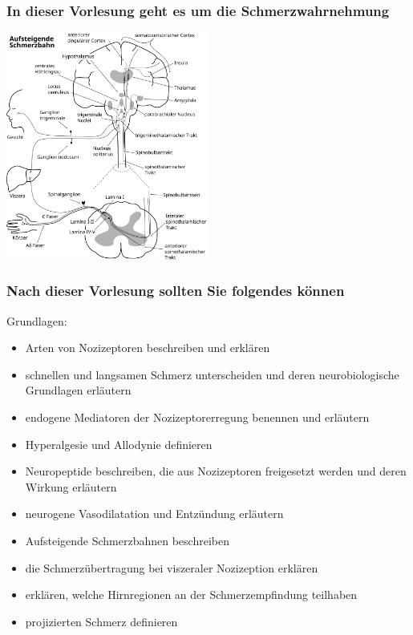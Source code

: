 \documentclass{beamer}
\begin{document}
\begin{frame}
\frametitle{In dieser Vorlesung geht es um die Schmerzwahrnehmung}
\begin{center}
\includegraphics[width=0.5\textwidth]{Schmerz_aufsteigend.png}
\end{center}

\end{frame}




\begin{frame}


 \frametitle{Nach dieser Vorlesung sollten Sie folgendes können}



\begin{block}{Grundlagen:}




\begin{itemize}

    \item 
Arten von Nozizeptoren beschreiben und erklären  %
    \item 
 schnellen und langsamen Schmerz unterscheiden und deren neurobiologische Grundlagen erläutern %
    \item 
 endogene Mediatoren der Nozizeptorerregung benennen und erläutern %
    \item 
Hyperalgesie und Allodynie definieren %
    \item 
 Neuropeptide beschreiben, die aus Nozizeptoren freigesetzt werden und deren Wirkung erläutern %
    \item 
 neurogene Vasodilatation und Entzündung erläutern
    \item 
 Aufsteigende Schmerzbahnen beschreiben %
    \item 
 die Schmerzübertragung bei viszeraler Nozizeption erklären  %
    \item 
erklären, welche  Hirnregionen an der Schmerzempfindung teilhaben %
    \item 
 projizierten Schmerz definieren %

\end{itemize}


\end{block}

\end{frame}
\end{document}
